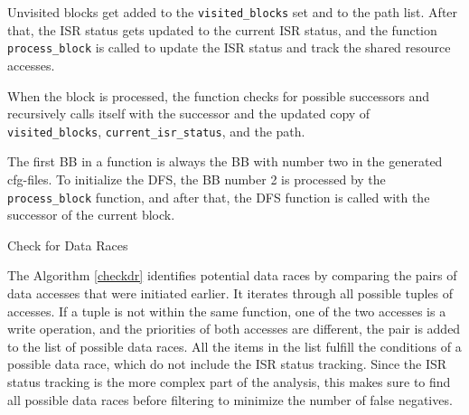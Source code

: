 \documentclass[
fancyheadings, %
%
%
]{stsreprt}
\begin{document}
{Unvisited blocks get added to the \texttt{visited\_blocks} set and to the path list. After that, the \ac{ISR} status gets updated to the current \ac{ISR} status, and the function \texttt{process\_block} is called to update the \ac{ISR} status and track the shared resource accesses.

When the block is processed, the function checks for possible successors and recursively calls itself with the successor and the updated copy of \texttt{visited\_blocks}, \texttt{current\_isr\_status}, and the path.

The first \ac{BB} in a function is always the \ac{BB} with number two in the generated cfg-files. To initialize the \ac{DFS}, the \ac{BB} number 2 is processed by the \texttt{process\_block} function, and after that, the \ac{DFS} function is called with the successor of the current block.



\begin{algorithm}[H]
	\label{checkdr}
	\caption{Check for Data Races}
	\DontPrintSemicolon
	\SetAlgoLined
	\BlankLine
\end{algorithm}
\vspace{1cm}

The Algorithm \ref{checkdr} identifies potential data races by comparing the pairs of data accesses that were initiated earlier. It iterates through all possible tuples of accesses. If a tuple is not within the same function, one of the two accesses is a write operation, and the priorities of both accesses are different, the pair is added to the list of possible data races. All the items in the list fulfill the conditions of a possible data race, which do not include the \ac{ISR} status tracking. Since the \ac{ISR} status tracking is the more complex part of the analysis, this makes sure to find all possible data races before filtering to minimize the number of false negatives.

}
\end{document}
